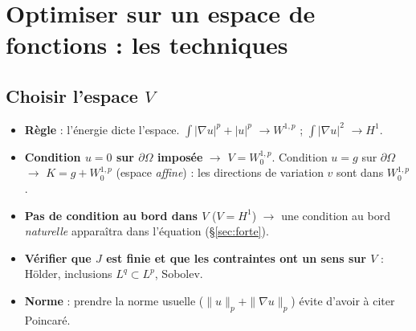 \documentclass[10pt,a4paper]{article}
\newcommand{\nr}[1]{\|#1\|}
\begin{document}
\section{Optimiser sur un espace de fonctions : les techniques}
\subsection{Choisir l'espace \texorpdfstring{$V$}{V}}\label{sec:choixV}
\begin{itemize}
\item \textbf{Règle} : l'énergie dicte l'espace. $\int|\nabla u|^p+|u|^p$ $\to W^{1,p}$ ; $\int|\nabla u|^2$ $\to H^1$.
\item \textbf{Condition $u=0$ sur $\partial\Omega$ imposée} $\to$ $V=W^{1,p}_0$. Condition $u=g$ sur $\partial\Omega$ $\to$ $K=g+W^{1,p}_0$ (espace \emph{affine}) : les directions de variation $v$ sont dans $W^{1,p}_0$.
\item \textbf{Pas de condition au bord dans $V$} ($V=H^1$) $\to$ une condition au bord \emph{naturelle} apparaîtra dans l'équation (§\ref{sec:forte}).
\item \textbf{Vérifier que $J$ est finie et que les contraintes ont un sens sur $V$} : Hölder, inclusions $L^q\subset L^p$, Sobolev.
\item \textbf{Norme} : prendre la norme usuelle ($\nr u_p+\nr{\nabla u}_p$) évite d'avoir à citer Poincaré.
\end{itemize}
\end{document}
